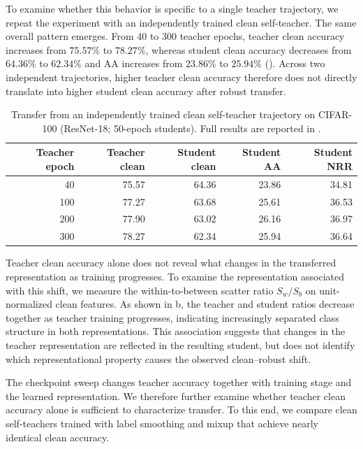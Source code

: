 \documentclass{article} %
\theoremstyle{plain}
\begin{document}
To examine whether this behavior is specific to a single teacher trajectory,
we repeat the experiment with an independently trained clean self-teacher.
The same overall pattern emerges.
From 40 to 300 teacher epochs, teacher clean accuracy increases from
\(75.57\%\) to \(78.27\%\), whereas student clean accuracy decreases from
\(64.36\%\) to \(62.34\%\) and AA increases from \(23.86\%\) to
\(25.94\%\) ().
Across two independent trajectories, higher teacher clean accuracy therefore
does not directly translate into higher student clean accuracy after robust
transfer.


\begin{table}[!htbp]
  \centering
  \small
  \setlength{\tabcolsep}{6pt}
  \caption{
  Transfer from an independently trained clean self-teacher trajectory on
  CIFAR-100 (ResNet-18; 50-epoch students).
  Full results are reported in .
  }
  \label{tab:teachertrajectory}
  \begin{tabular}{rrrrr}
    \toprule
    Teacher epoch & Teacher clean & Student clean & Student AA & Student NRR \\
    \midrule
    40  & 75.57 & 64.36 & 23.86 & 34.81 \\
    100 & 77.27 & 63.68 & 25.61 & 36.53 \\
    200 & 77.90 & 63.02 & 26.16 & 36.97 \\
    300 & 78.27 & 62.34 & 25.94 & 36.64 \\
    \bottomrule
  \end{tabular}
\end{table}


Teacher clean accuracy alone does not reveal what changes in the transferred
representation as training progresses.
To examine the representation associated with this shift, we measure the
within-to-between scatter ratio \(S_w/S_b\) on unit-normalized clean features.
As shown in b, the teacher and student ratios decrease
together as teacher training progresses, indicating increasingly separated
class structure in both representations.
This association suggests that changes in the teacher representation are
reflected in the resulting student, but does not identify which
representational property causes the observed clean--robust shift.

The checkpoint sweep changes teacher accuracy together with training stage and
the learned representation.
We therefore further examine whether teacher clean accuracy alone is
sufficient to characterize transfer.
To this end, we compare clean self-teachers trained with label smoothing and
mixup that achieve nearly identical clean accuracy.
\end{document}
